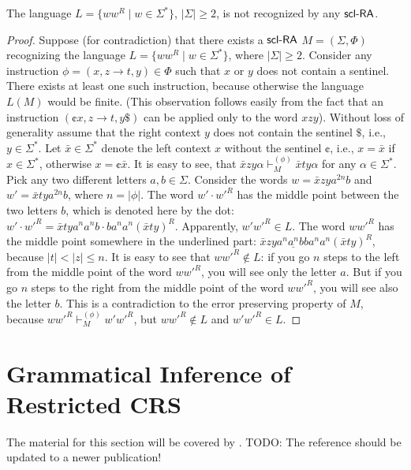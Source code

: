 \begin{theorem}[\cite{C13}]
The language $L = \{ w w^R \mid w \in \Sigma^* \}$, $|\Sigma| \ge 2$, is not recognized by any $\mbox{\sf scl-RA}$.
\end{theorem}

\begin{proof}
Suppose (for contradiction) that there exists a $\mbox{\sf scl-RA}$ $M = (\Sigma, \Phi)$  recognizing the language $L = \{ w w^R \mid w \in \Sigma^* \}$, where $|\Sigma| \ge 2$. Consider any instruction $\phi = (x, z \to t, y) \in \Phi$ such that $x$ or $y$ does not contain a sentinel. There exists at least one such instruction, because otherwise the language $L(M)$ would be finite. (This observation follows easily from the fact that an instruction  $(\cent x, z \to t, y\$)$ can be applied only to the word $xzy$). Without loss of generality assume that the right context $y$ does not contain the sentinel $\$$, i.e., $y \in \Sigma^*$. Let $\bar{x} \in \Sigma^*$ denote the left context $x$ without the sentinel $\cent$, i.e., $x = \bar{x}$ if $x \in \Sigma^*$, otherwise $x = \cent \bar{x}$. It is easy to see, that $\bar{x} z y \alpha \vdash_M^{(\phi)} \bar{x} t y \alpha$ for any $\alpha \in \Sigma^*$. Pick any two different letters $a, b \in \Sigma$. Consider the words $w = \bar{x} z y a^{2n} b$ and $w' = \bar{x} t y a^{2n} b$, where $n = |\phi|$. The word $w' \cdot w'^R$ has the middle point between the two letters $b$, which is denoted here by the dot: $w' \cdot w'^R = \bar{x} t y a^n a^n b \cdot b a^n a^n (\bar{x} t y)^R$. Apparently, $w' w'^R \in L$. The word $w w'^R$ has the middle point somewhere in the underlined part: $\bar{x} z y a^n \underline{a^n} b b a^n a^n (\bar{x} t y)^R$, because $|t| < |z| \le n$. It is easy to see that $w w'^R \notin L$: if you go $n$ steps to the left from the middle point of the word $w w'^R$, you will see only the letter $a$. But if you go $n$ steps to the right from the middle point of the word $w w'^R$, you will see also the letter $b$. This is a contradiction to the error preserving property of $M$, because $w w'^R \vdash_M^{(\phi)} w' w'^R$, but $w w'^R \notin L$ and $w' w'^R \in L$.
\end{proof}

\section{Grammatical Inference of Restricted CRS}\label{section:inference}

The material for this section will be covered by \cite{C12}.
TODO: The reference should be updated to a newer publication!
